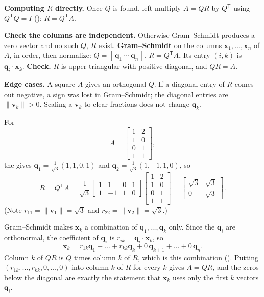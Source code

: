 \documentclass[10pt]{scrartcl}
\newcommand{\vv}[1]{\mathbf{#1}}
\newenvironment{howto}[1]{\begin{mdframed}[style=howtostyle,frametitle={#1}]}{\end{mdframed}}
\begin{document}
\noindent\textbf{Computing $R$ directly.} Once $Q$ is found, left-multiply $A=QR$ by $Q^{\mathsf T}$ using $Q^{\mathsf T}Q=I$ (): $R = Q^{\mathsf T}A$.

\begin{howto}{How to find a QR factorization}
  \begin{steps}
    \ii \textbf{Check the columns are independent.} Otherwise Gram--Schmidt produces a zero vector and no such $Q$, $R$ exist.
    \ii \textbf{Gram--Schmidt} on the columns $\vv x_1,\dots,\vv x_n$ of $A$, in order, then normalize: $Q=[\,\vv q_1\ \cdots\ \vv q_n\,]$.
    \ii \textbf{$R=Q^{\mathsf T}A$.} Its entry $(i,k)$ is $\vv q_i\cdot\vv x_k$.
    \ii \textbf{Check.} $R$ is upper triangular with positive diagonal, and $QR=A$.
  \end{steps}
  \textbf{Edge cases.} A square $A$ gives an orthogonal $Q$. If a diagonal entry of $R$ comes out negative, a sign was lost in Gram--Schmidt; the diagonal entries are $\|\vv v_k\|>0$. Scaling a $\vv v_k$ to clear fractions does not change $\vv q_k$.
\end{howto}

\begin{example*}[Computing $A=QR$]
  For
  \[
    A=\begin{bmatrix}1&2\\1&0\\0&1\\1&1\end{bmatrix},
  \]
  the  gives $\vv q_1=\frac{1}{\sqrt{3}}(1,1,0,1)$ and $\vv q_2=\frac{1}{\sqrt{3}}(1,-1,1,0)$, so
  \[
    R = Q^{\mathsf T}A = \frac{1}{\sqrt{3}}\begin{bmatrix}1&1&0&1\\1&-1&1&0\end{bmatrix}\begin{bmatrix}1&2\\1&0\\0&1\\1&1\end{bmatrix}
    = \begin{bmatrix}\sqrt{3}&\sqrt{3}\\0&\sqrt{3}\end{bmatrix}.
  \]
  (Note $r_{11}=\|\vv v_1\|=\sqrt{3}$ and $r_{22}=\|\vv v_2\|=\sqrt{3}$.)
\end{example*}

\revisit Gram--Schmidt makes $\vv x_k$ a combination of $\vv q_1,\dots,\vv q_k$ only. Since the $\vv q_i$ are orthonormal, the coefficient of $\vv q_i$ is $r_{ik}=\vv q_i\cdot\vv x_k$, so
\[
  \vv x_k=r_{1k}\vv q_1+\dots+r_{kk}\vv q_k+0\,\vv q_{k+1}+\dots+0\,\vv q_n .
\]
Column $k$ of $QR$ is $Q$ times column $k$ of $R$, which is this combination (). Putting $(r_{1k},\dots,r_{kk},0,\dots,0)$ into column $k$ of $R$ for every $k$ gives $A=QR$, and the zeros below the diagonal are exactly the statement that $\vv x_k$ uses only the first $k$ vectors $\vv q_i$.
\end{document}

